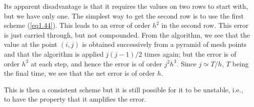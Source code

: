 Its apparent disadvantage is that it requires the values on two rows to start with, but we have only one. The simplest way to get the second row is to use the first scheme (\ref{eq1.44}). This leads to an error of order $h^2$ in the second row. This error is just carried through, but not compounded. From the algorithm, we see that the value at the point $(i,j)$ is  obtained successively from a pyramid of mesh points and that the algorithm is applied $j (j-1)/2$ times again; but the error is of order $h^3$ at each step, and hence the error is of order $j^2 h^3$. Since $j \simeq T/ h$, $T$ being the final time, we see that the net error is of order $h$.

This is then a consistent scheme but it is still possible for it to be unstable, i.e., to have the property that it amplifies the error.

